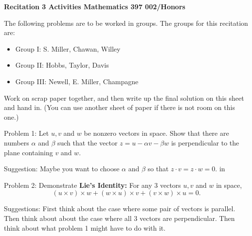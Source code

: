
\sf
\begin{center}
{\bf Recitation 3 Activities  Mathematics 397 002/Honors }
\end{center}
\bigskip
The following  problems are to be worked in groups. The groups for
this recitation are: 
\begin{itemize}
\item Group I: S. Miller, Chawan,  Willey
\item Group II: Hobbs, Taylor, Davis 
\item Group III: Newell, E. Miller, Champagne
\end{itemize}

Work on scrap paper together, and then write up the final solution on this
sheet and hand in. (You can use another sheet of paper if there is not
room on this one.)
\par
\bigskip
Problem 1: Let $u,v$ and $w$ be nonzero vectors in space. Show that there are
numbers $\alpha$ and $\beta$ such that the vector $z = u - \alpha v -
\beta w$ is perpendicular to the plane containing $v$ and $w$.
\smallskip
\par
Suggestion: Maybe you want to choose $\alpha$ and $\beta$ so that
$z\cdot v = z\cdot w = 0.$
 in
\par
Problem 2: Demonstrate {\bf Lie's Identity:} For any 3 vectors $u,v$ and $w$ 
in space,
$$
(u\times v)\times w + (w \times u)\times v + (v \times w) \times u = 0.
$$
\smallskip
\par Suggestions: First think about the case where some pair of vectors is
parallel. Then think about about the case where all 3 vectors are
perpendicular. Then think about what problem 1 might have to do with it.
 

